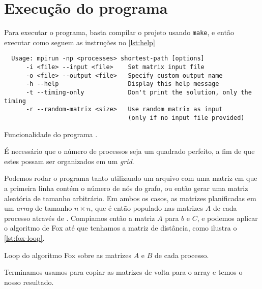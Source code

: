 \pagebreak

\section{Execução do programa}

Para executar o programa, basta compilar o projeto usando \verb|make|, e então
executar como seguem as instruções no \cref{lst:help}

\begin{listing}
  \small
	\begin{verbatim}
  Usage: mpirun -np <processes> shortest-path [options]
      -i <file> --input <file>    Set matrix input file
      -o <file> --output <file>   Specify custom output name
      -h --help                   Display this help message
      -t --timing-only            Don't print the solution, only the timing
      -r --random-matrix <size>   Use random matrix as input
                                  (only if no input file provided)
  \end{verbatim}
	\caption{Funcionalidade do programa .}%
	\label{lst:help}
\end{listing}

É necessário que o número de processos seja um quadrado perfeito, a fim de
que estes possam ser organizados em um \emph{grid}.

Podemos rodar o programa tanto utilizando um arquivo com uma matriz em
que a primeira linha contém o número de nós do grafo, ou então gerar uma matriz
aleatória de tamanho arbitrário. Em ambos os casos, as matrizes planificadas
em um \emph{array}  de tamanho \(n\times n\), que é então populado nas matrizes
\(A\) de cada processo através de . %
Compiamos então a matriz \(A\) para \(b\) e \(C\), e podemos
aplicar o algoritmo de Fox até que tenhamos a matriz de distância, 
como ilustra o \cref{lst:fox-loop}.

\begin{listing}
  \caption{Loop do algoritmo Fox sobre as matrizes \(A\) e \(B\) de cada processo.}%
  \label{lst:fox-loop}
\end{listing}

Terminamos usamos  para copiar as matrizes de volta %
para o array  e temos o nosso resultado.
